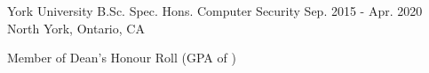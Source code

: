 

\begin{cventries}

  \cventry
    {York University} %
    {B.Sc. Spec. Hons. Computer Security} %
    {Sep. 2015 - Apr. 2020} %
    {North York, Ontario, CA} %
    {
      \begin{cvitems} %
        \item {Member of Dean's Honour Roll (GPA of )}
        \item {}
      \end{cvitems} 
    }

\end{cventries}
